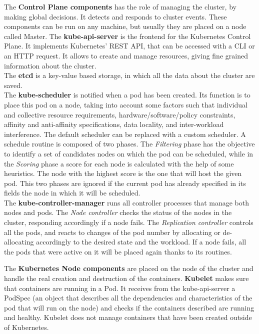 The \textbf{Control Plane components} has the role of managing the cluster, by making global decisions.
It detects and responds to cluster events. These components can be run on any machine, but usually
they are placed on a node called Master.
The \textbf{kube-api-server} is the frontend for the Kubernetes Control Plane. It implements Kubernetes'
REST API, that can be accessed with a CLI or an HTTP request. It allows to create and manage resources,
giving fine grained information about the cluster.
\\
The \textbf{etcd} is a key-value based storage, in which all the data about the cluster are saved.
\\
The \textbf{kube-scheduler} is notified when a pod has been created. Its function is to place this pod
on a node, taking into account some factors such that individual and collective resource
requirements, hardware/software/policy constraints, affinity and anti-affinity specifications,
data locality, and inter-workload interference.
The default scheduler can be replaced with a custom scheduler. A schedule routine
is composed of two phases. The \textit{Filtering} phase has the objective to identify a set 
of candidates nodes on which the pod can be scheduled, while in the \textit{Scoring} phase
a score for each node is calculated with the help of some heuristics. The node with the highest score
is the one that will host the given pod.
This two phases are ignored if the current pod has already specified in its fields the node
in which it will be scheduled.
\\
The \textbf{kube-controller-manager} runs all controller processes that manage both nodes and 
pods. The \textit{Node controller}
checks the status of the nodes in the cluster, responding accordingly if a node fails.
The \textit{Replication controller} controls all the pods, and reacts to changes of the pod number
by allocating or de-allocating accordingly to the desired state and the workload. If a node fails, all 
the pods that were active on it will be placed again thanks to its routines.
\par 
The \textbf{Kubernetes Node components} are placed on the node of the cluster and handle
the real creation and destruction of the containers.
\textbf{Kubelet} makes sure that containers are running in a Pod. It receives from the kube-api-server
a PodSpec (an object that describes all the dependencies and characteristics of the pod that
will run on the node) and checks if the containers described are running and healthy.
Kubelet does not manage containers that have been created outside of Kubernetes.
